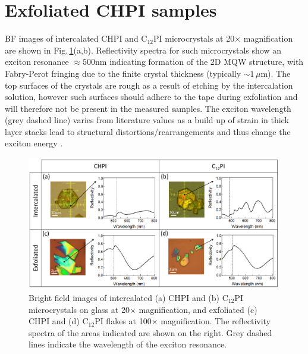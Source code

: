 \section{Exfoliated CHPI samples}
BF images of intercalated CHPI and C$_{12}$PI microcrystals at 20$\times$ magnification are shown in Fig.\,\ref{5Fig2}(a,b). Reflectivity spectra for such microcrystals show an exciton resonance $\approx500$nm indicating formation of the 2D MQW structure, with Fabry-Perot fringing due to the finite crystal thickness (typically $\sim1\,\mu$m). The top surfaces of the crystals are rough as a result of etching by the intercalation solution, however such surfaces should adhere to the tape during exfoliation and will therefore not be present in the measured samples. The exciton wavelength (grey dashed line) varies from literature values as a build up of strain in thick layer stacks lead to structural distortions/rearrangements and thus change the exciton energy \cite{Saikumar2012, VijayaPrakash2009, Pradeesh2009b}. 
\begin{figure}[h!] 
\centering    
\includegraphics[width=\textwidth]{Fig2}
\caption[Intercalated and exfoliated perovskite microcrystals.]{Bright field images of intercalated (a) CHPI and (b) C$_{12}$PI microcrystals on glass at 20$\times$ magnification, and exfoliated (c) CHPI and (d) C$_{12}$PI flakes at 100$\times$ magnification. The reflectivity spectra of the areas indicated are shown on the right. Grey dashed lines indicate the wavelength of the exciton resonance.}
\label{5Fig2}
\end{figure}


